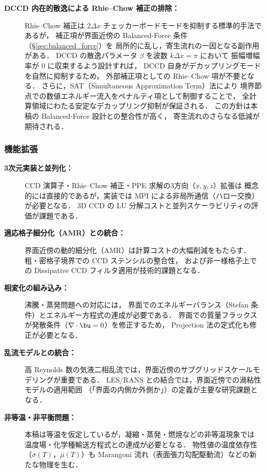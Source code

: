 \begin{description}
  \item[\textbf{DCCD 内在的散逸による Rhie--Chow 補正の排除：}]
        Rhie--Chow 補正は $2\Delta x$ チェッカーボードモードを抑制する標準的手法であるが，
        補正項が界面近傍の Balanced-Force 条件（§\ref{sec:balanced_force}）を
        局所的に乱し，寄生流れの一因となる副作用がある．
        DCCD の散逸パラメータ $\beta$ を波数 $k\Delta x = \pi$ において
        振幅増幅率が $0$ に収束するよう設計すれば，
        DCCD 自身がデカップリングモードを自然に抑制するため，
        外部補正項としての Rhie--Chow 項が不要となる．
        さらに，SAT（Simultaneous Approximation Term）法により
        境界節点での数値エネルギー流入をペナルティ項として制御することで，
        全計算領域にわたる安定なデカップリング抑制が保証される．
        この方針は本稿の Balanced-Force 設計との整合性が高く，
        寄生流れのさらなる低減が期待される．
\end{description}

\subsubsection{機能拡張}

\begin{description}
  \item[\textbf{3次元実装と並列化：}]
        CCD 演算子・Rhie--Chow 補正・PPE 求解の3方向（$x,y,z$）拡張は
        概念的には直接的であるが，実装では MPI による非局所通信（ハロー交換）が必要となる．
        3D CCD の LU 分解コストと並列スケーラビリティの評価が課題である．

  \item[\textbf{適応格子細分化（AMR）との統合：}]
        界面近傍の動的細分化（AMR）は計算コストの大幅削減をもたらす．
        粗・密格子境界での CCD ステンシルの整合性，
        および非一様格子上での Dissipative CCD フィルタ適用が技術的課題となる．

  \item[\textbf{相変化の組み込み：}]
        沸騰・蒸発問題への対応には，
        界面でのエネルギーバランス（Stefan 条件）とエネルギー方程式の連成が必要である．
        界面での質量フラックスが発散条件（$\nabla\cdot\bu = 0$）を修正するため，
        Projection 法の定式化も修正が必要となる．

  \item[\textbf{乱流モデルとの統合：}]
        高 Reynolds 数の気液二相乱流では，界面近傍のサブグリッドスケールモデリングが重要である．
        LES/RANS との結合では，界面近傍での渦粘性モデルの適用範囲
        （「界面の内側か外側か」）の定義が主要な研究課題となる．

  \item[\textbf{非等温・非平衡問題：}]
        本稿は等温を仮定しているが，凝縮・蒸発・燃焼などの非等温現象では
        温度場・化学種輸送方程式との連成が必要となる．
        物性値の温度依存性（$\sigma(T)$，$\mu(T)$）も
        Marangoni 流れ（表面張力勾配駆動流）などの新たな物理を生む．
\end{description}

